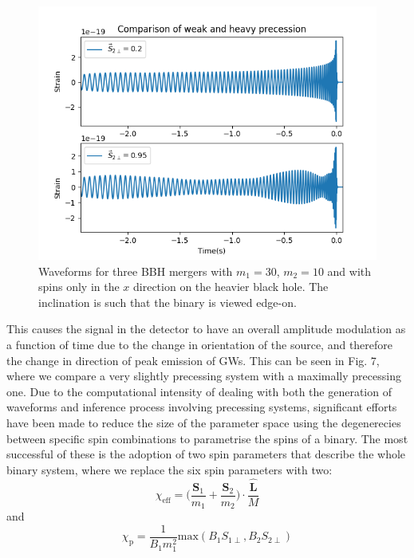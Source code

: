 \documentclass[11pt]{article}
\begin{document}
\begin{figure}[H]
	\includegraphics[scale=0.8]{fig7.png}
	\centering
	\caption{Waveforms for three BBH mergers with $m_1=30$, $m_2=10$ and with spins only in the $x$ direction on the heavier black hole. The inclination is such that the binary is viewed edge-on.}
	\centering
\end{figure}
This causes the signal in the detector to have an overall amplitude modulation as a function of time due to the change in orientation of the source, and therefore the change in direction of peak emission of GWs. This can be seen in Fig. 7, where we compare a very slightly precessing system with a maximally precessing one.
Due to the computational intensity of dealing with both the generation of waveforms and inference process involving precessing systems, significant efforts have been made to reduce the size of the parameter space using the degenerecies between specific spin combinations to parametrise the spins of a binary. The most successful of these is the adoption of two spin parameters\cite{imr}\cite{chip} that describe the whole binary system, where we replace the six spin parameters with two:
\begin{equation}
\chi_{\text{eff}}=\bigg(\frac{\mathbf{S}_1}{m_1}+\frac{\mathbf{S}_2}{m_2}\bigg)\cdot\frac{\mathbf{\hat{L}}}{M}
\end{equation}
and
\begin{equation}
\chi_\text{p}=\frac{1}{B_1m^2_1}\text{max}(B_1S_{1\perp},B_2S_{2\perp})
\end{equation}
\end{document}
